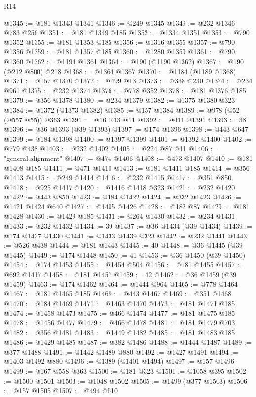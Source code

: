 \begin{lexlean}{R14}
\begin{coremodule}
@1345 := @181 @1343 @1341
@1346 := @249 @1345
@1349 := @232 @1346 @783 @256
@1351 := @181 @1349 @185
@1352 := @1334 @1351
@1353 := @790 @1352
@1355 := @181 @1353 @185
@1356 := @1316 @1355
@1357 := @790 @1356
@1359 := @181 @1357 @185
@1360 := @1280 @1359
@1361 := @790 @1360
@1362 := @1194 @1361
@1364 := @190 (@1190 @1362)
@1367 := @190 (@212 @800) @218
@1368 := @1364 @1367
@1370 := @1184 (@1189 @1368)
@1371 := @157 @1370
@1372 := @499 @13
@1373 := @338 @230
@1374 := @234 @961
@1375 := @232 @1374
@1376 := @778 @352
@1378 := @181 @1376 @185
@1379 := @356 @1378
@1380 := @234 @1379
@1382 := @1375 @1380 @323
@1384 := @1372 (@1373 @1382)
@1385 := @157 @1384
@1389 := @978 (@52 (@557 @55)) @363
@1391 := @16 @13 @11
@1392 := @411 @1391
@1393 := 38
@1396 := @36 @1393 (@39 @1393)
@1397 := @174 @1396
@1398 := @443 @647
@1399 := @184 @1398
@1400 := @1397 @1399
@1401 := @1392 @1400
@1402 := @779 @438
@1403 := @232 @1402
@1405 := @224 @87 @11
@1406 := "general.alignment"
@1407 := @474 @1406
@1408 := @473 @1407
@1410 := @181 @1408 @185
@1411 := @471 @1410
@1413 := @181 @1411 @185
@1414 := @356 @1413
@1415 := @249 @1414
@1416 := @232 @1415
@1417 := @351 @850
@1418 := @925 @1417
@1420 := @1416 @1418 @323
@1421 := @232 @1420
@1422 := @443 @850
@1423 := @184 @1422
@1424 := @332 @1423
@1426 := @1421 @1424 @640
@1427 := @1405 @1426
@1428 := @182 @87
@1429 := @181 @1428
@1430 := @1429 @185
@1431 := @264 @1430
@1432 := @234 @1431
@1433 := @232 @1432
@1434 := 39
@1437 := @36 @1434 (@39 @1434)
@1439 := @174 @1437 @1430
@1441 := @1433 @1439 @323
@1442 := @232 @1441
@1443 := @526 @438
@1444 := @181 @1443
@1445 := 40
@1448 := @36 @1445 (@39 @1445)
@1449 := @174 @1448
@1450 := 41
@1453 := @36 @1450 (@39 @1450)
@1454 := @174 @1453
@1455 := @1454 @504
@1456 := @181 @1455
@1457 := @692 @1417
@1458 := @181 @1457
@1459 := 42
@1462 := @36 @1459 (@39 @1459)
@1463 := @174 @1462
@1464 := @1444 @964
@1465 := @778 @1464
@1467 := @181 @1465 @185
@1468 := @443 @1467
@1469 := @351 @1468
@1470 := @184 @1469
@1471 := @1463 @1470
@1473 := @181 @1471 @185
@1474 := @1458 @1473
@1475 := @466 @1474
@1477 := @181 @1475 @185
@1478 := @1456 @1477
@1479 := @466 @1478
@1481 := @181 @1479 @703
@1482 := @356 @1481
@1483 := @1449 @1482
@1485 := @181 @1483 @185
@1486 := @1429 @1485
@1487 := @382 @1486
@1488 := @1444 @1487
@1489 := @377 @1488
@1491 := @1442 @1489 @880
@1492 := @1427 @1491
@1494 := @1403 @1492 @880
@1496 := @1389 (@1401 @1494)
@1497 := @157 @1496
@1499 := @167 @558 @363
@1500 := @181 @323
@1501 := @1058 @395
@1502 := @1500 @1501
@1503 := @1048 @1502
@1505 := @1499 (@377 @1503)
@1506 := @157 @1505
@1507 := @494 @510

\end{coremodule}
\end{lexlean}
